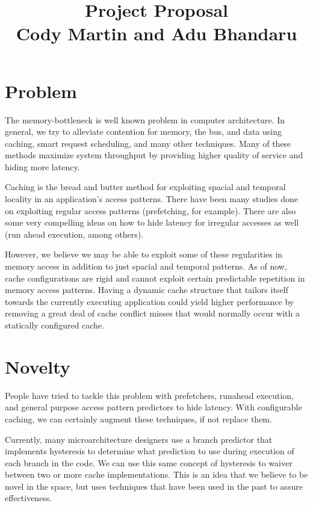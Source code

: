 \documentclass[pageno]{jpaper}
\begin{document}
\title{\textbf{Project Proposal}\\Cody Martin and Adu Bhandaru}

\date{}
\maketitle

\thispagestyle{empty}

\section{Problem}
The memory-bottleneck is well known problem in computer architecture. In general, we try to alleviate contention for memory, the bus, and data using caching, smart request scheduling, and many other techniques. Many of these methods maximize system throughput by providing higher quality of service and hiding more latency.

Caching is the bread and butter method for exploiting spacial and temporal locality in an application's access patterns. There have been many studies done on exploiting regular access patterns (prefetching, for example). There are also some very compelling ideas on how to hide latency for irregular accesses as well (run ahead execution, among others).

However, we believe we may be able to exploit some of these regularities in memory access in addition to just spacial and temporal patterns. As of now, cache configurations are rigid and cannot exploit certain predictable repetition in memory access patterns. Having a dynamic cache structure that tailors itself towards the currently executing application could yield higher performance by removing a great deal of cache conflict misses that would normally occur with a statically configured cache.  

\section{Novelty}
People have tried to tackle this problem with prefetchers, runahead execution, and general purpose access pattern predictors to hide latency. With configurable caching, we can certainly augment these techniques, if not replace them. 

Currently, many microarchitecture designers use a branch predictor that implements hysteresis to determine what prediction to use during execution of each branch in the code. We can use this same concept of hysteresis to waiver between two or more cache implementations. This is an idea that we believe to be novel in the space, but uses techniques that have been used in the past to assure effectiveness.
\end{document}

